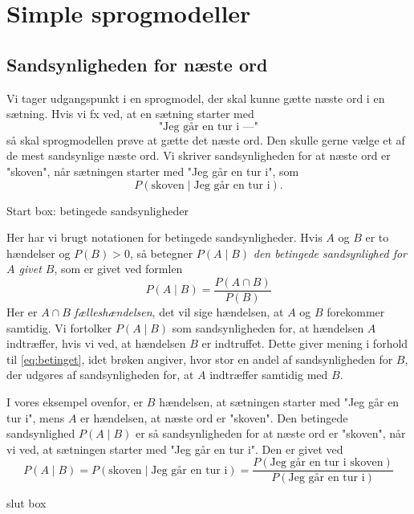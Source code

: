 \documentclass{article}
\newcommand{\am}[1]{{\color{red} #1}}
\begin{document}
\section{Simple sprogmodeller}

\subsection*{Sandsynligheden for næste ord}

Vi tager udgangspunkt i en sprogmodel, der skal kunne gætte næste ord i en sætning.
Hvis vi fx ved, at en sætning starter med 
$$\text{"Jeg går en tur i ---"}$$
så skal sprogmodellen prøve at gætte det næste ord. Den skulle gerne vælge et af de mest sandsynlige næste ord.  Vi skriver sandsynligheden for at næste ord er "skoven", når  sætningen starter med "Jeg går en tur i", som 
\begin{equation*}
P(\text{skoven} \mid \text{Jeg går en tur i}).
\end{equation*}

\am{Start box: betingede sandsynligheder}

Her har vi brugt notationen for betingede sandsynligheder.
Hvis $A$ og $B$ er to hændelser og $P(B)>0$, så betegner $P(A\mid B)$ \emph{den betingede sandsynlighed for $A$ givet $B$}, som er givet ved formlen
\begin{equation}\label{eq:betinget}
P(A\mid B) = \frac{P(A\cap B)}{P(B)}
\end{equation}
Her er $A\cap B$ \emph{fælleshændelsen}, det vil sige hændelsen, at $A$ og $B$  forekommer samtidig. Vi fortolker $P(A\mid B)$  som sandsynligheden for, at hændelsen $A$ 
 indtræffer, hvis vi ved, at hændelsen  $B$
 er indtruffet. Dette giver mening i forhold til  \eqref{eq:betinget}, idet brøken angiver, hvor stor en andel af sandsynligheden for $B$, der udgøres af sandsynligheden for, at $A$
 indtræffer samtidig med $B$.

 I vores eksempel ovenfor, er $B$ hændelsen, at sætningen starter med "Jeg går en tur i", mens $A$ er hændelsen, at næste ord er "skoven". Den betingede sandsynlighed $P(A\mid B)$ er så sandsynligheden for at næste ord er "skoven", når vi ved, at sætningen starter med "Jeg går en tur i". Den er givet ved
 \begin{equation*}
P(A\mid B) = P(\text{skoven} \mid \text{Jeg går en tur i}) = \frac{P(\text{Jeg går en tur i skoven})}{P(\text{Jeg går en tur i})}
\end{equation*}

 \am{slut box}
\end{document}

